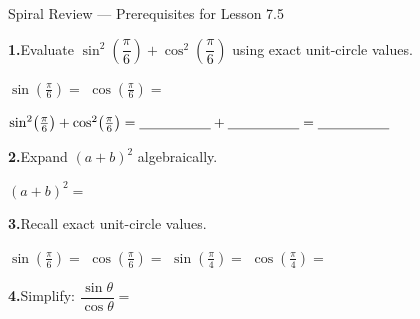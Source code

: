 \documentclass[10pt]{article}
\begin{document}
\namedateperiod

\vspace{0.10in}

\begin{notesbox}{Spiral Review --- Prerequisites for Lesson 7.5}

\textbf{1.}\quad Evaluate $\sin^2\!\left(\dfrac{\pi}{6}\right) + \cos^2\!\left(\dfrac{\pi}{6}\right)$
using exact unit-circle values.

\vspace{4pt}
$\sin\!\left(\tfrac{\pi}{6}\right) = $ \blank{1.8cm}\quad
$\cos\!\left(\tfrac{\pi}{6}\right) = $ \blank{1.8cm}

\vspace{6pt}
$\sin^2\!\left(\tfrac{\pi}{6}\right) + \cos^2\!\left(\tfrac{\pi}{6}\right)
= \blank{1.8cm} + \blank{1.8cm} = \blank{1.8cm}$

\vspace{0.14in}
\textbf{2.}\quad Expand $(a + b)^2$ algebraically.

\vspace{4pt}
$(a + b)^2 = $ \blank{6cm}

\vspace{0.14in}
\textbf{3.}\quad Recall exact unit-circle values.

\vspace{4pt}
$\sin\!\left(\tfrac{\pi}{6}\right) = $ \blank{1.6cm}\hspace{0.6cm}
$\cos\!\left(\tfrac{\pi}{6}\right) = $ \blank{1.6cm}\hspace{0.6cm}
$\sin\!\left(\tfrac{\pi}{4}\right) = $ \blank{1.6cm}\hspace{0.6cm}
$\cos\!\left(\tfrac{\pi}{4}\right) = $ \blank{1.6cm}

\vspace{0.14in}
\textbf{4.}\quad Simplify: $\dfrac{\sin\theta}{\cos\theta} = $ \blank{2.5cm}

\end{notesbox}
\end{document}

